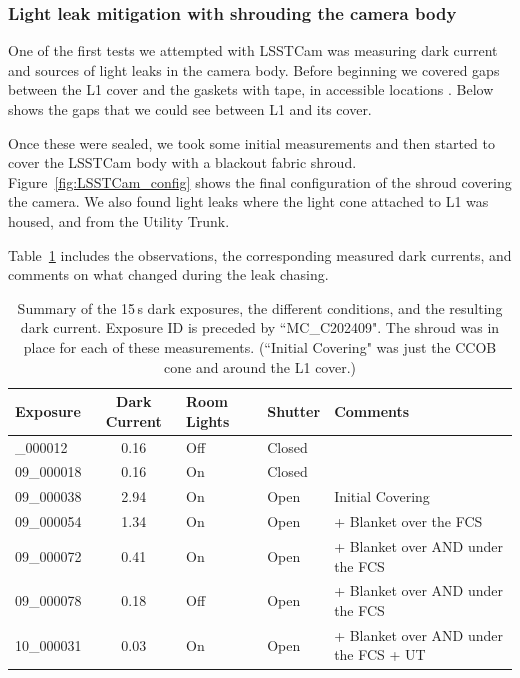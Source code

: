 \subsubsection{Light leak mitigation with shrouding the camera
body}\label{light-leak-mitigation-with-shrouding-the-camera-body}

One of the first tests we attempted with LSSTCam was measuring dark
current and sources of light leaks in the camera body. Before beginning we covered gaps between the L1 cover and the gaskets with tape, in accessible locations . Below shows the gaps that we could see between L1 and its cover.

Once these were sealed, we took some initial measurements and then
started to cover the LSSTCam body with a blackout fabric shroud. Figure~\ref{fig:LSSTCam_config} shows the final configuration of the shroud covering the
camera.
We also found light leaks
where the light cone attached to L1 was housed, and from the Utility
Trunk. 


Table~\ref{tab:leak_chasing} includes the observations, the corresponding measured dark
currents, and comments on what changed during the leak chasing.

\begin{longtable}{|l|c|l|l|l|}
\caption{Summary of the 15\,s dark exposures, the different conditions, and the resulting dark current.
Exposure ID is preceded by ``MC\_C202409".  The shroud was in place for each of these measurements.  (``Initial Covering" was just the CCOB cone and around the L1 cover.) \label{tab:leak_chasing}} \\
\hline
\textbf{Exposure} & \textbf{Dark Current} & \textbf{Room Lights} &\textbf{Shutter} & \textbf{Comments} \\

\hline
\endfirsthead
\hline
\hline
\endhead
\hline
\endfoot
\hline
09\_000012 & 0.16 & Off & Closed & \\
09\_000018 & 0.16 & On & Closed & \\
09\_000038 & 2.94 & On & Open & Initial Covering  \\
09\_000054 & 1.34 & On & Open &  + Blanket over the FCS \\
09\_000072 & 0.41 & On & Open &  + Blanket over AND under the FCS \\
09\_000078 & 0.18 & Off & Open & + Blanket over AND under the FCS \\
10\_000031 & 0.03 & On & Open &  + Blanket over AND under the FCS + UT \\

\end{longtable}


